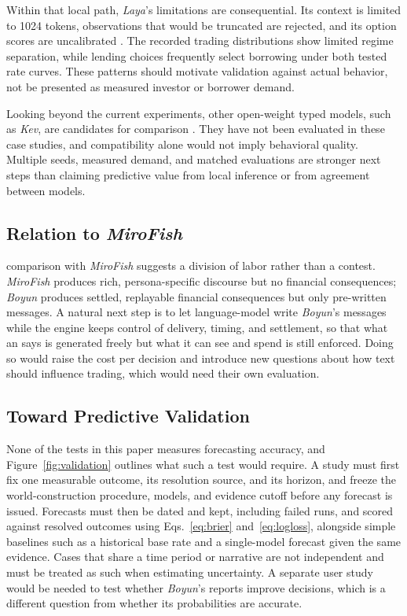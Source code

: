 Within that local path, \textit{Laya}'s limitations are consequential.
Its context is limited to 1024 tokens, observations that would be truncated are
rejected, and its option scores are uncalibrated \cite{layamodel}. The recorded
trading distributions show limited regime separation, while lending choices
frequently select borrowing under both tested rate curves. These patterns
should motivate validation against actual behavior, not be presented as
measured investor or borrower demand.

Looking beyond the current experiments, other open-weight typed models, such
as \textit{Kev}, are candidates for comparison \cite{kevrepo}. They have not
been evaluated in these case studies, and compatibility alone would not imply
behavioral quality. Multiple seeds, measured demand, and matched evaluations
are stronger next steps than claiming predictive value from local inference
or from agreement between models.

\subsection{Relation to \textit{MiroFish}}
 comparison with \textit{MiroFish} suggests a division of labor rather than
a contest. \textit{MiroFish} produces rich, persona-specific discourse  but no
financial consequences; \textit{Boyun}  produces settled, replayable financial
consequences  but only pre-written messages. A natural next step is to let
language-model  write \textit{Boyun}'s  messages while the engine keeps
control of delivery, timing, and settlement, so that what an  says
is generated freely but what it can see and spend is still enforced. Doing so
would raise the cost per decision and introduce new questions about how text
should influence trading, which would need their own evaluation.

\subsection{Toward Predictive Validation}
None of the tests in this paper measures forecasting accuracy, and
Figure~\ref{fig:validation} outlines what such a test would require. A study
must first fix one measurable outcome, its resolution source, and its
horizon, and freeze the world-construction procedure, models, and evidence
cutoff before any forecast is issued. Forecasts must then be dated and kept,
including failed runs, and scored against resolved outcomes using
Eqs.~\eqref{eq:brier} and~\eqref{eq:logloss}, alongside simple baselines such
as a historical base rate and a single-model forecast given the same
evidence. Cases that share a time period or narrative are not independent and
must be treated as such when estimating uncertainty. A separate user study
would be needed to test whether \textit{Boyun}'s reports improve decisions,
which is a different question from whether its probabilities are accurate.

